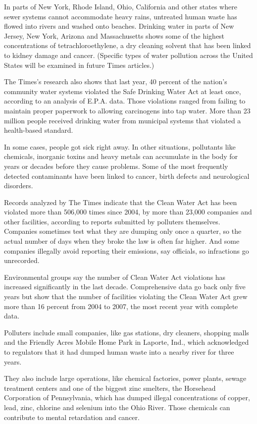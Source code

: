 ﻿\documentclass[12pt]{article}
\begin{document}
In parts of New York, Rhode Island, Ohio, California and other states where sewer systems cannot
accommodate heavy rains, untreated human waste has flowed into rivers and washed onto beaches.
Drinking water in parts of New Jersey, New York, Arizona and Massachusetts shows some of the highest
concentrations of tetrachloroethylene, a dry cleaning solvent that has been linked to kidney damage
and cancer. (Specific types of water pollution across the United States will be examined in future
Times articles.)

The Times's research also shows that last year, 40 percent of the nation's community water systems
violated the Safe Drinking Water Act at least once, according to an analysis of E.P.A. data. Those
violations ranged from failing to maintain proper paperwork to allowing carcinogens into tap water.
More than 23 million people received drinking water from municipal systems that violated a
health-based standard.

In some cases, people got sick right away. In other situations, pollutants like chemicals, inorganic
toxins and heavy metals can accumulate in the body for years or decades before they cause problems.
Some of the most frequently detected contaminants have been linked to cancer, birth defects and
neurological disorders.

Records analyzed by The Times indicate that the Clean Water Act has been violated more than 506,000
times since 2004, by more than 23,000 companies and other facilities, according to reports submitted
by polluters themselves. Companies sometimes test what they are dumping only once a quarter, so the
actual number of days when they broke the law is often far higher. And some companies illegally
avoid reporting their emissions, say officials, so infractions go unrecorded.

Environmental groups say the number of Clean Water Act violations has increased significantly in the
last decade. Comprehensive data go back only five years but show that the number of facilities
violating the Clean Water Act grew more than 16 percent from 2004 to 2007, the most recent year with
complete data.

Polluters include small companies, like gas stations, dry cleaners, shopping malls and the Friendly
Acres Mobile Home Park in Laporte, Ind., which acknowledged to regulators that it had dumped human
waste into a nearby river for three years.

They also include large operations, like chemical factories, power plants, sewage treatment centers
and one of the biggest zinc smelters, the Horsehead Corporation of Pennsylvania, which has dumped
illegal concentrations of copper, lead, zinc, chlorine and selenium into the Ohio River. Those
chemicals can contribute to mental retardation and cancer.
\end{document}
